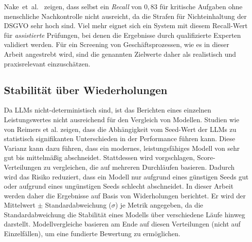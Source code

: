 Nake~et~al.\ \cite{nake2023towards} zeigen, dass selbst ein \emph{Recall} von $0{,}83$ für kritische Aufgaben ohne menschliche Nachkontrolle nicht ausreicht, da die Strafen für Nichteinhaltung der \ac{DSGVO} sehr hoch sind. Viel mehr eignet sich ein System mit diesem Recall-Wert für \emph{assistierte} Prüfungen, bei denen die Ergebnisse durch qualifizierte Experten validiert werden. Für ein Screening von Geschäftsprozessen, wie es in dieser Arbeit angestrebt wird, sind die genannten Zielwerte daher als realistisch und praxisrelevant einzuschätzen.

\subsection*{Stabilität über Wiederholungen}

Da \acp{LLM} nicht-deterministisch sind, ist das Berichten eines einzelnen Leistungswertes nicht ausreichend für den Vergleich von Modellen. Studien wie von Reimers et al. \cite{reimers2017reporting} zeigen, dass die Abhängigkeit vom Seed-Wert der \acp{LLM} zu statistisch signifikanten Unterschieden in der Performance führen kann. Diese Varianz kann dazu führen, dass ein modernes, leistungsfähiges Modell von sehr gut bis mittelmäßig abschneidet. Stattdessen wird vorgschlagen, Score-Verteilungen zu vergleichen, die auf mehreren Durchläufen basieren. Dadurch wird das Risiko reduziert, dass ein Modell nur aufgrund eines günstigen Seeds gut oder aufgrund eines ungünstigen Seeds schlecht abschneidet. In dieser Arbeit werden daher die Ergebnisse auf Basis von Widerholungen berichtet. Er wird der Mittelwert $\pm$ Standardabweichung ($\sigma$) je Metrik angegeben, da die Standardabweichung die Stabilität eines Modells über verschiedene Läufe hinweg darstellt. Modellvergleiche basieren am Ende auf diesen Verteilungen (nicht auf Einzelfällen), um eine fundierte Bewertung zu ermöglichen.